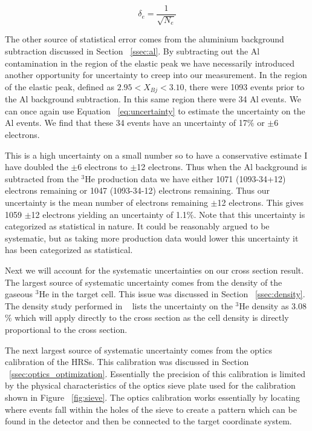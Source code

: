\begin{equation} \label{eq:uncertainty}
	\delta_e = \frac{1}{\sqrt{N_e}}
\end{equation}

The other source of statistical error comes from the aluminium background subtraction discussed in Section ~\ref{ssec:al}. By subtracting out the Al contamination in the region of the elastic peak we have necessarily introduced another opportunity for uncertainty to creep into our measurement. In the region of the elastic peak, defined as $2.95<X_{Bj}<3.10$, there were 1093 events prior to the Al background subtraction. In this same region there were 34 Al events. We can once again use Equation ~\ref{eq:uncertainty} to estimate the uncertainty on the Al events. We find that these 34 events have an uncertainty of 17$\%$ or $\pm$6 electrons. 

This is a high uncertainty on a small number so to have a conservative estimate I have doubled the $\pm$6 electrons to $\pm$12 electrons. Thus when the Al background is subtracted from the $^3$He production data we have either 1071 (1093-34+12) electrons remaining or 1047 (1093-34-12) electrons remaining. Thus our uncertainty is the mean number of electrons remaining $\pm$12 electrons. This gives 1059 $\pm$12 electrons yielding an uncertainty of 1.1$\%$. Note that this uncertainty is categorized as statistical in nature. It could be reasonably argued to be systematic, but as taking more production data would lower this uncertainty it has been categorized as statistical.

Next we will account for the systematic uncertainties on our cross section result. The largest source of systematic uncertainty comes from the density of the gaseous $^3$He in the target cell. This issue was discussed in Section ~\ref{ssec:density}. The density study performed in ~\cite{density} lists the uncertainty on the  $^3$He density as 3.08$\%$ which will apply directly to the cross section as the cell density is directly proportional to the cross section.

The next largest source of systematic uncertainty comes from the optics calibration of the HRSs. This calibration was discussed in Section ~\ref{ssec:optics_optimization}. Essentially the precision of this calibration is limited by the physical characteristics of the optics sieve plate used for the calibration shown in Figure ~\ref{fig:sieve}. The optics calibration works essentially by locating where events fall within the holes of the sieve to create a pattern which can be found in the detector and then be connected to the target coordinate system. 


